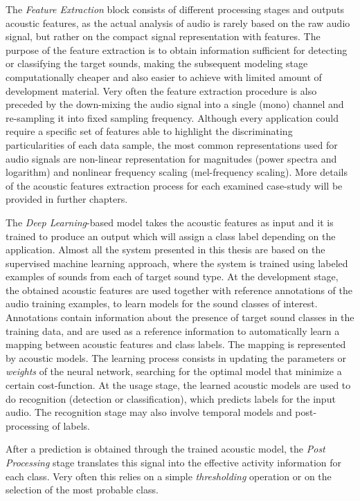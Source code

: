 The \textit{Feature Extraction} block consists
of different processing stages and outputs acoustic features, as the actual analysis of audio is rarely based on the raw audio signal, but rather on the compact signal
representation with features. The purpose of the feature extraction is to obtain
information sufficient for detecting or classifying the target sounds, making the
subsequent modeling stage computationally cheaper and also easier to achieve with
limited amount of development material. Very often the feature extraction procedure is also preceded by the down-mixing the audio signal into a single (mono) channel and re-sampling it into fixed sampling frequency.
Although every application could require a specific set of features able to highlight the discriminating particularities of each data sample, the most common representations used
for audio signals are non-linear representation for magnitudes (power spectra and logarithm) and nonlinear frequency scaling (mel-frequency scaling). 
More details of the acoustic features extraction process for each examined case-study will be provided in further chapters.


The \textit{Deep Learning}-based model takes the acoustic features as input and it is trained to produce an output which will assign a class label depending on the application. Almost all the system presented in this thesis are based on the supervised machine learning approach, where the system is trained using labeled examples of sounds from each of target sound type. 
At the development stage, the obtained acoustic features are used together with
reference annotations of the audio training examples, to learn models for the
sound classes of interest. Annotations contain information about the presence of
target sound classes in the training data, and are used as a reference information
to automatically learn a mapping between acoustic features and class labels. The
mapping is represented by acoustic models. The learning process consists in updating the parameters or \textit{weights} of the neural network, searching for the optimal model that minimize a certain cost-function. 
At the usage stage, the learned acoustic models are used to do recognition (detection or classification), which predicts labels
for the input audio. The recognition stage may also involve temporal models and
post-processing of labels.


After a prediction is obtained through the trained acoustic model, the \textit{Post Processing} stage translates this signal into the effective activity information for each class. Very often this relies on a simple \textit{thresholding} operation or on the selection of the most probable class.



